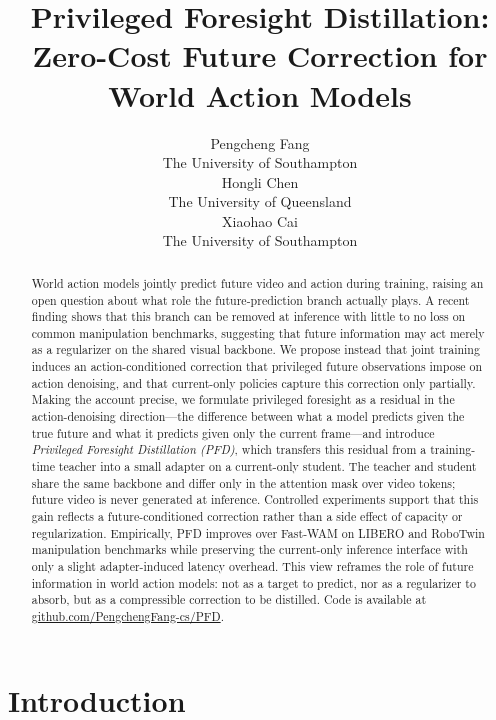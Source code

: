 \documentclass{article}
\title{Privileged Foresight Distillation: Zero-Cost Future
Correction for World Action Models}
\author{
 Pengcheng Fang \\
  The University of Southampton\\
   \And
 Hongli Chen \\
  The University of Queensland\\
  \And
 Xiaohao Cai \\
  The University of Southampton\\
}
\begin{document}
\maketitle

\newcommand{\xmark}{\ding{55}}


\begin{abstract}
World action models jointly predict future video and action during training, raising an open question about what role the future-prediction branch actually plays. A recent finding shows that this branch can be removed at inference with little to no loss on common manipulation benchmarks, suggesting that future information may act merely as a regularizer on the shared visual backbone. We propose instead that joint training induces an action-conditioned correction that privileged future observations impose on action denoising, and that current-only policies capture this correction only partially. Making the account precise, we formulate privileged foresight as a residual in the action-denoising direction---the difference between what a model predicts given the true future and what it predicts given only the current frame---and introduce \emph{Privileged Foresight Distillation (PFD)}, which transfers this residual from a training-time teacher into a small adapter on a current-only student. The teacher and student share the same backbone and differ only in the attention mask over video tokens; future video is never generated at inference. Controlled experiments support that this gain reflects a future-conditioned correction rather than a side effect of capacity or regularization. Empirically, PFD improves over Fast-WAM on LIBERO and RoboTwin manipulation benchmarks while preserving the current-only inference interface with only a slight adapter-induced latency overhead. This view reframes the role of future information in world action models: not as a target to predict, nor as a regularizer to absorb, but as a compressible correction to be distilled. Code is available at \href{https://github.com/PengchengFang-cs/PFD}{github.com/PengchengFang-cs/PFD}.
\end{abstract}

\section{Introduction}
\label{sec:intro}
\end{document}
